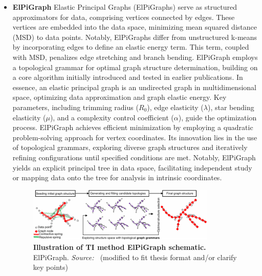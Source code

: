 \begin{itemize}
    \item \textbf{ElPiGraph}
    Elastic Principal Graphs (ElPiGraphs)\citep{albergante2020ElPiGraph} serve as structured approximators for data, comprising vertices connected by edges. These vertices are embedded into the data space, minimizing mean squared distance (MSD) to data points. Notably, ElPiGraphs differ from unstructured k-means by incorporating edges to define an elastic energy term. This term, coupled with MSD, penalizes edge stretching and branch bending. ElPiGraph employs a topological grammar for optimal graph structure determination, building on a core algorithm initially introduced and tested in earlier publications\citep{gorban2007topological}. In essence, an elastic principal graph is an undirected graph in multidimensional space, optimizing data approximation and graph elastic energy. Key parameters, including trimming radius ($R_0$), edge elasticity ($\lambda$), star bending elasticity ($\mu$), and a complexity control coefficient ($\alpha$), guide the optimization process. ElPiGraph achieves efficient minimization by employing a quadratic problem-solving approach for vertex coordinates. Its innovation lies in the use of topological grammars, exploring diverse graph structures and iteratively refining configurations until specified conditions are met. Notably, ElPiGraph yields an explicit principal tree in data space, facilitating independent study or mapping data onto the tree for analysis in intrinsic coordinates. 
    
     \begin{figure}[ht!]
    	\centering
    	\includegraphics[width=0.85\textwidth]{TI_Alg_ElPiGraph/fig}
    	\vspace{0.1cm}
    	\caption[Illustration of TI method ElPiGraph schematic.]{\textbf{Illustration of TI method ElPiGraph schematic.} ElPiGraph. \emph{Source: ~\cite{cao2019monocle3}}(modified to fit thesis format and/or clarify key points)
    	}
    	\label{fig:TI_Alg_ElPiGraph}
    \end{figure}


\end{itemize}
